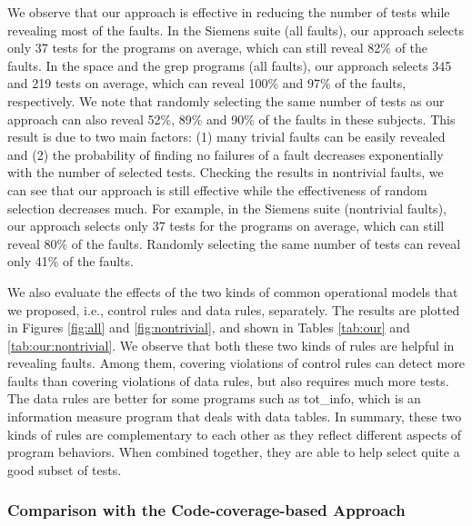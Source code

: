 \documentclass{sig-alternate}
\begin{document}
We observe that our approach is effective in reducing the number of
tests while revealing most of the faults. In the Siemens suite (all
faults), our approach selects only 37 tests for the programs on
average, which can still reveal 82\% of the faults. In the space and
the grep programs (all faults), our approach selects 345 and 219
tests on average, which can reveal 100\% and 97\% of the faults,
respectively. We note that randomly selecting the same number of
tests as our approach can also reveal 52\%, 89\% and 90\% of the
faults in these subjects. This result is due to two main factors:
(1) many trivial faults can be easily revealed and (2) the
probability of finding no failures of a fault decreases
exponentially with the number of selected tests. Checking the
results in nontrivial faults, we can see that our approach is still
effective while the effectiveness of random selection decreases
much. For example, in the Siemens suite (nontrivial faults), our
approach selects only 37 tests for the programs on average, which
can still reveal 80\% of the faults. Randomly selecting the same
number of tests can reveal only 41\% of the faults.

We also evaluate the effects of the two kinds of common operational
models that we proposed, i.e., control rules and data rules,
separately. The results are plotted in Figures \ref{fig:all} and
\ref{fig:nontrivial}, and shown in Tables \ref{tab:our} and
\ref{tab:our:nontrivial}. We observe that both these two kinds of
rules are helpful in revealing faults. Among them, covering
violations of control rules can detect more faults than covering
violations of data rules, but also requires much more tests. The
data rules are better for some programs such as tot\_info, which is
an information measure program that deals with data tables. In
summary, these two kinds of rules are complementary to each other as
they reflect different aspects of program behaviors. When combined
together, they are able to help select quite a good subset of tests.




\subsubsection{Comparison with the Code-coverage-based Approach}
\end{document}
